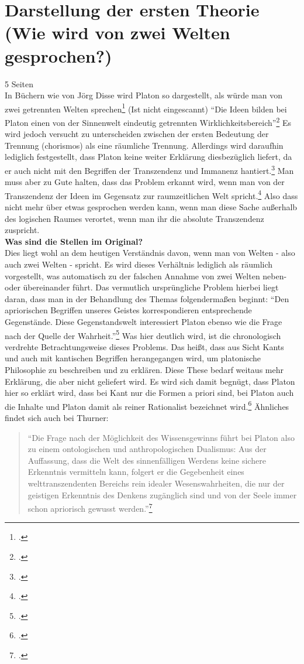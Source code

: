 \documentclass[12pt]{article}
\newcommand*{\zitatblock}[1]{%
    \begin{quote}
    \fontsize{10}{12}\selectfont
    \setlength{\parskip}{1.0em}
    #1
    \end{quote}
}
\begin{document}
\section{Darstellung der ersten Theorie (Wie wird von zwei Welten gesprochen?)}
5 Seiten\\
In Büchern wie von Jörg Disse wird Platon so dargestellt, als würde man von zwei getrennten Welten sprechen\footcite[vgl.][S. 22 und 28]{DisseMetaphysik} (Ist nicht eingescannt)
\enquote{Die Ideen bilden bei Platon einen von der Sinnenwelt eindeutig getrennten Wirklichkeitsbereich}\footcite[][S. 31]{DisseMetaphysik}
Es wird jedoch versucht zu unterscheiden zwischen der ersten Bedeutung der Trennung (chorismos) als eine räumliche Trennung. Allerdings wird daraufhin lediglich festgestellt, dass Platon keine weiter Erklärung diesbezüglich liefert, da er auch nicht mit den Begriffen der Transzendenz und Immanenz hantiert.\footcite[vgl.][S. 34f]{DisseMetaphysik} Man muss aber zu Gute halten, dass das Problem erkannt wird, wenn man von der Transzendenz der Ideen im Gegensatz zur raumzeitlichen Welt spricht.\footcite[vgl.][S. 35]{DisseMetaphysik} Also dass nicht mehr über etwas gesprochen werden kann, wenn man diese Sache außerhalb des logischen Raumes verortet, wenn man ihr die absolute Transzendenz zuspricht.\\
\textbf{Was sind die Stellen im Original?}\\
Dies liegt wohl an dem heutigen Verständnis davon, wenn man von Welten - also auch zwei Welten - spricht. Es wird dieses Verhältnis lediglich als räumlich vorgestellt, was automatisch zu der falschen Annahme von zwei Welten neben- oder übereinander führt.
Das vermutlich ursprüngliche Problem hierbei liegt daran, dass man in der Behandlung des Themas folgendermaßen beginnt: \enquote{Den apriorischen Begriffen unseres Geistes korrespondieren entsprechende Gegenstände. Diese Gegenstandswelt interessiert Platon ebenso wie die Frage nach der Quelle der Wahrheit.}\footcite[][S. 97]{Hirschberger}
Was hier deutlich wird, ist die chronologisch verdrehte Betrachtungsweise dieses Problems. Das heißt, dass aus Sicht Kants und auch mit kantischen Begriffen herangegangen wird, um platonische Philosophie zu beschreiben und zu erklären. Diese These bedarf weitaus mehr Erklärung, die aber nicht geliefert wird. Es wird sich damit begnügt, dass Platon hier so erklärt wird, dass bei Kant nur die Formen a priori sind, bei Platon auch die Inhalte und Platon damit als reiner Rationalist bezeichnet wird.\footcite[vgl.][S.96]{Hirschberger} Ähnliches findet sich auch bei Thurner:\zitatblock{\enquote{Die Frage nach der Möglichkeit des Wissensgewinns führt bei Platon also zu einem ontologischen und anthropologischen Dualismus: Aus der Auffassung, dass die Welt des sinnenfälligen Werdens keine sichere Erkenntnis vermitteln kann, folgert er die Gegebenheit eines welttranszendenten Bereichs rein idealer Wesenswahrheiten, die nur der geistigen Erkenntnis des Denkens zugänglich sind und von der Seele immer schon apriorisch gewusst werden.}\footcite[][S. 99]{ThurnerDualismus}}
\end{document}
